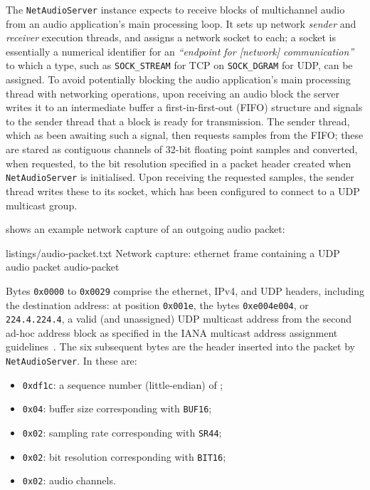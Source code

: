 The \texttt{NetAudioServer} instance expects to receive blocks of
multichannel audio from an audio application's main processing loop.
It sets up network \textit{sender} and \textit{receiver} execution threads, and
assigns a network socket to each; a socket is essentially a numerical identifier
for an \textit{``endpoint for [network] communication''}
~\citep{noauthor_socket2_nodate} to which a type, such as \texttt{SOCK\_STREAM}
for TCP on \texttt{SOCK\_DGRAM} for UDP, can be assigned.
To avoid potentially blocking the audio application's main processing thread
with networking operations, upon receiving an audio block the server writes it
to an intermediate buffer \textemdash{} a first-in-first-out (FIFO) structure
\textemdash{} and signals to the sender thread that a block is ready for
transmission.
The sender thread, which as been awaiting such a signal, then requests samples
from the FIFO; these are stared as contiguous channels of 32-bit floating point
samples and converted, when requested, to the bit resolution specified in a
packet header created when \texttt{NetAudioServer} is initialised.
Upon receiving the requested samples, the sender thread writes these to its
socket, which has been configured to connect to a UDP multicast group.

 shows an example network capture of an outgoing
audio packet:

{listings/audio-packet.txt}
{Network capture: ethernet frame containing a UDP audio packet}
{audio-packet}

Bytes \texttt{0x0000} to \texttt{0x0029} comprise the ethernet, IPv4, and UDP
headers, including the destination address: at position \texttt{0x001e}, the
bytes \texttt{0xe004e004}, or \texttt{224.4.224.4}, a valid (and unassigned)
UDP multicast address from the second ad-hoc address block as specified in the
IANA multicast address assignment guidelines~\citep{meyer_iana_2010}.
The six subsequent bytes are the header inserted into the packet by
\texttt{NetAudioServer}.
In  these are:
\begin{itemize}
    \item \texttt{0xdf1c}: a sequence number (little-endian) of ;
    \item \texttt{0x04}: buffer size  corresponding with
    \texttt{BUF16};
    \item \texttt{0x02}: sampling rate  corresponding with
    \texttt{SR44};
    \item \texttt{0x02}: bit resolution  corresponding with
    \texttt{BIT16};
    \item \texttt{0x02}:  audio channels.
\end{itemize}

